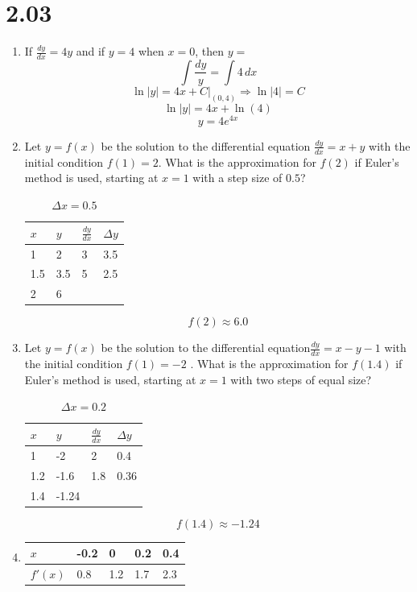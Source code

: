 \documentclass[12pt]{article}
\begin{document}
\section*{2.03}
\begin{enumerate}
    \item If $\frac{dy}{dx}=4y$ and if $y=4$ when $x=0$, then $y=$
$$\int \frac{dy}{y} = \int 4 \, dx$$
$$\ln|y|=4x+C \biggr\rvert_{(0,4)} \Longrightarrow \ln|4|=C$$ 
$$\ln|y|=4x+\ln(4)$$ 
$$y=4e^{4x}$$ 

    \item Let $y=f(x)$ be the solution to the differential equation $\frac{dy}{dx}=x+y$ with the initial condition $f(1)=2$. What is the approximation for $f(2)$ if Euler’s method is used, starting at $x=1$ with a step size of $0.5$?
\begin{table}[H]
\caption{$\Delta x = 0.5$}
\centering \label{table_example}
\begin{tabular}{l|lll}
$x$ & \multicolumn{1}{l|}{$y$} & \multicolumn{1}{l|}{$\frac{dy}{dx}$} & $\Delta y$ \\ \hline
1 & 2 & 3 & 3.5 \\
1.5 & 3.5 & 5 & 2.5 \\
2 & 6 &  & 
\end{tabular}
\end{table}
$$\boxed{f(2) \approx 6.0}$$

    \item Let $y=f(x)$ be the solution to the differential equation$\frac{dy}{dx}=x-y-1$ with the initial condition $f(1)=-2$ . What is the approximation for $f(1.4)$ if Euler’s method is used, starting at $x=1$ with two steps of equal size?

\begin{table}[H]
\caption{$\Delta x = 0.2$}
\centering \label{table_example}
\begin{tabular}{l|lll}
$x$ & \multicolumn{1}{l|}{$y$} & \multicolumn{1}{l|}{$\frac{dy}{dx}$} & $\Delta y$ \\ \hline
1 & -2 & 2 & 0.4 \\
1.2 & -1.6 & 1.8 & 0.36 \\
1.4 & -1.24 &  & 
\end{tabular}
\end{table}
$$\boxed{f(1.4) \approx -1.24}$$

    \item 

\begin{table}[H]
\centering
\begin{tabular}{l|llll}
$x$     & -0.2 & 0   & 0.2 & 0.4 \\ \hline
$f'(x)$ & 0.8  & 1.2 & 1.7 & 2.3
\end{tabular}
\end{table}


\end{enumerate}
\end{document}
